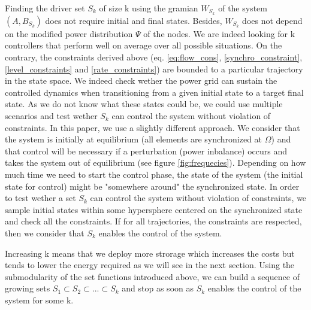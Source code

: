 \documentclass[conference]{IEEEtran}
\begin{document}
Finding the driver set $S_k$ of size k using the gramian $W_{S_k}$ of the system $(A,B_{S_k})$ does not require initial and final states. Besides, $W_{S_k}$ does not depend on the modified power distribution $ \Psi $ of the nodes. We are indeed looking for k controllers that perform well on average over all possible situations. On the contrary, the constraints derived above (eq. \ref{eq:flow_cons}, \ref{synchro_constraint}, \ref{level_constraints} and \ref{rate_constraints}) are bounded to a particular trajectory in the state space. We indeed check wether the power grid can sustain the controlled dynamics when transitioning from a given initial state to a target final state. As we do not know what these states could be, we could use multiple scenarios and test wether $S_k$ can control the system without violation of constraints. In this paper, we use a slightly different approach. We consider that the system is initially at equilibrium (all elements are synchronized at $\Omega$) and that control will be necessary if a perturbation (power inbalance) occurs and takes the system out of equilibrium (see figure \ref{fig:frequecies}). Depending on how much time we need to start the control phase, the state of the system (the initial state for control) might be "somewhere around" the synchronized state. In order to test wether a set $S_k$ can control the system without violation of constraints, we sample initial states within some hypersphere centered on the synchronized state and check all the constraints. If for all trajectories, the constraints are respected, then we consider that $S_k$ enables the control of the system.

Increasing k means that we deploy more strorage which increases the costs but tends to lower the energy required as we will see in the next section. Using the submodularity of the set functions introduced above, we can build a sequence of growing sets $S_1 \subset S_2 \subset ... \subset S_k $ and stop as soon as $S_k$ enables the control of the system for some k.

\end{document}
